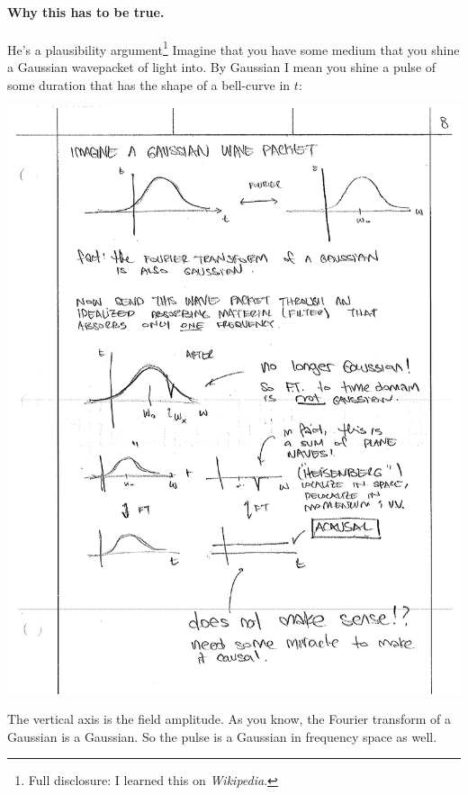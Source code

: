 \paragraph{Why this has to be true.} He's a plausibility argument\footnote{Full disclosure: I learned this on \emph{Wikipedia}.} Imagine that you have some medium that you shine a Gaussian wavepacket of light into. By Gaussian I mean you shine a pulse of some duration that has the shape of a bell-curve in $t$:
\begin{center}
\includegraphics[width=.7\textwidth]{figures/Kramers_02.pdf}
\end{center}
The vertical axis is the field amplitude. As you know, the Fourier transform of a Gaussian is a Gaussian. So the pulse is a Gaussian in frequency space as well. 

